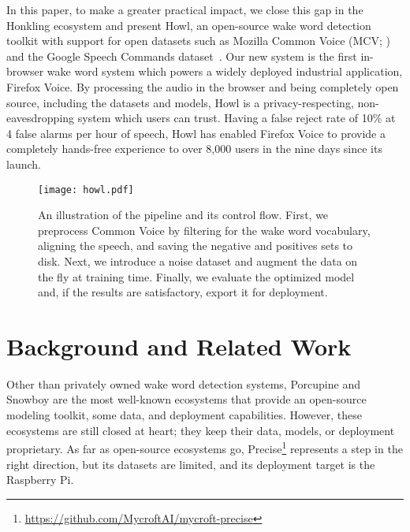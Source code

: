 \documentclass[11pt,a4paper]{article}
\begin{document}
In this paper, to make a greater practical impact, we close this gap in the Honkling ecosystem and present Howl, an open-source wake word detection toolkit with support for open datasets such as Mozilla Common Voice (MCV; \citealp{ardila2019common}) and the Google Speech Commands dataset~\cite{warden2018speech}.
Our new system is the first in-browser wake word system which powers a widely deployed industrial application, Firefox Voice.
By processing the audio in the browser and being completely open source, including the datasets and models, Howl is a privacy-respecting, non-eavesdropping system which users can trust.
Having a false reject rate of 10\% at 4 false alarms per hour of speech, Howl has enabled Firefox Voice to provide a completely hands-free experience to over 8,000 users in the nine days since its launch.























\begin{figure*}[!t]
  \centering
  \texttt{[image: howl.pdf]}
  \caption{An illustration of the pipeline and its control flow. First, we preprocess Common Voice by filtering for the wake word vocabulary, aligning the speech, and saving the negative and positives sets to disk. Next, we introduce a noise dataset and augment the data on the fly at training time. Finally, we evaluate the optimized model and, if the results are satisfactory, export it for deployment.}
  \label{fig:pipeline}
\end{figure*}

\section{Background and Related Work}
Other than privately owned wake word detection systems, Porcupine and Snowboy are the most well-known ecosystems that provide an open-source modeling toolkit, some data, and deployment capabilities.
However, these ecosystems are still closed at heart; they keep their data, models, or deployment proprietary.
As far as open-source ecosystems go, Precise\footnote{\url{https://github.com/MycroftAI/mycroft-precise}} represents a step in the right direction, but its datasets are limited, and its deployment target is the Raspberry Pi.
\end{document}

